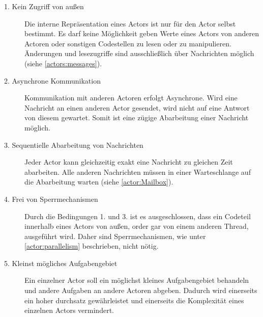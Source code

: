 \begin{description}
    \item[1. Kein Zugriff von außen]\label{actor:requirements:shareNothing}
    Die interne Repräsentation eines Actors ist nur für den Actor selbst bestimmt. Es darf keine Möglichkeit geben Werte eines Actors von anderen Actoren oder sonstigen Codestellen zu lesen oder zu manipulieren. Änderungen und lesezugriffe sind ausschließlich über Nachrichten möglich (siehe \ref{actors:messages}). 
    \item[2. Asynchrone Kommunikation]\label{actor:requirements:AsynchronCommunication}
    Kommunikation mit anderen Actoren erfolgt Asynchrone. Wird eine Nachricht an einen anderen Actor gesendet, wird nicht auf eine Antwort von diesem gewartet. Somit ist eine zügige Abarbeitung einer Nachricht möglich.
    \item[3. Sequentielle Abarbeitung von Nachrichten]
    Jeder Actor kann gleichzeitig exakt eine Nachricht zu gleichen Zeit abarbeiten. Alle anderen Nachrichten müssen in einer Warteschlange auf die Abarbeitung warten (siehe \ref{actor:Mailbox}).
    \item[4. Frei von Sperrmechanismen]
    Durch die Bedingungen {1.} und  {3.} ist es ausgeschlossen, dass ein Codeteil innerhalb eines Actors von außen, order gar von einem anderen Thread, ausgeführt wird. Daher sind Sperrmechanismen, wie unter \ref{actor:parallelism} beschrieben, nicht nötig.
    \item[5. Kleinst mögliches Aufgabengebiet]
    Ein einzelner Actor soll ein möglichst kleines Aufgabengebiet behandeln und andere Aufgaben an andere Actoren abgeben. Dadurch wird einerseits ein hoher durchsatz gewährleistet und einerseits die Komplexität eines einzelnen Actors vermindert.
\end{description}

